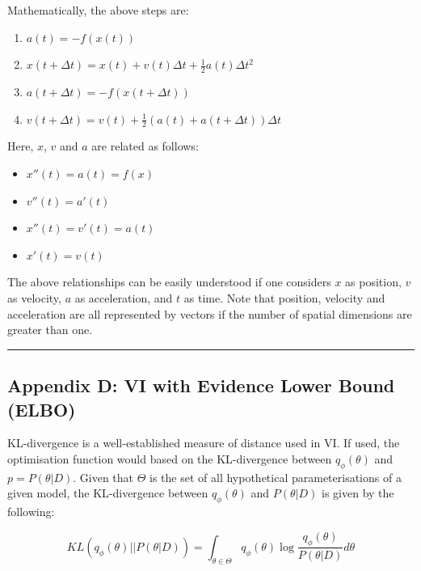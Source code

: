 \documentclass[conference]{IEEEtran}
\begin{document}
Mathematically, the above steps are:\\

\begin{enumerate}
	\item $a(t) = -f(x(t))$
	\item $x(t + \Delta t) = x(t) + v(t)\Delta t + \frac{1}{2}a(t)\Delta t^2$
	\item $a(t + \Delta t) = -f(x(t+\Delta t))$
	\item $v(t + \Delta t)=v(t) + \frac{1}{2}(a(t) + a(t + \Delta t))\Delta t$\\
\end{enumerate}

Here, $x$, $v$ and $a$ are related as follows:\\

\begin{itemize}
	\item $x''(t) = a(t) = f(x)$
	\item $v''(t) = a'(t)$
	\item $x''(t) = v'(t) = a(t)$
	\item $x'(t) = v(t)$\\
\end{itemize}

The above relationships can be easily understood if one considers $x$ as position, $v$ as velocity, $a$ as acceleration, and $t$ as time. Note that position, velocity and acceleration are all represented by vectors if the number of spatial dimensions are greater than one.

\par\noindent\rule{0.49\textwidth}{0.1pt}

\subsection*{Appendix D: VI with Evidence Lower Bound (ELBO)}
KL-divergence is a well-established measure of distance used in VI. If used, the optimisation function would based on the KL-divergence between $q_\phi(\theta)$ and $p = P(\theta|D)$. Given that $\Theta$ is the set of all hypothetical parameterisations of a given model, the KL-divergence between $q_\phi(\theta)$ and $P(\theta|D)$ is given by the following:

\begin{equation*}
	KL(q_\phi(\theta) || P(\theta|D))
	= \int_{\theta \in \Theta} q_\phi(\theta) \log \frac{q_\phi(\theta)}{P(\theta|D)} d\theta
\end{equation*}\\
\end{document}
